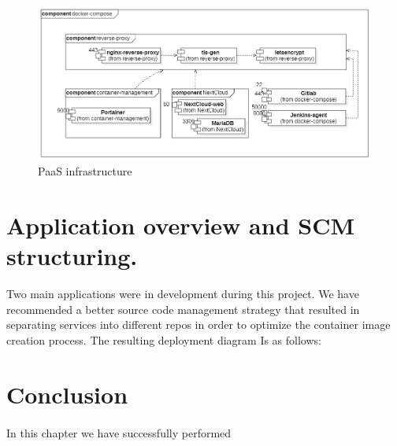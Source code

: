  \begin{figure}[H] 
\includegraphics[width=1.0\textwidth,angle=00]{assets/f9.jpg}
\caption{PaaS infrastructure}
\label{fig:f9}
\end{figure}

\section{Application overview and SCM structuring.}

Two main applications were in development during this project. We have recommended a better source code management strategy that resulted in separating services into different repos in order to optimize the container image creation process. The resulting deployment diagram Is as follows:
 
\section*{Conclusion}
\paragraph{}In this chapter we have successfully performed

